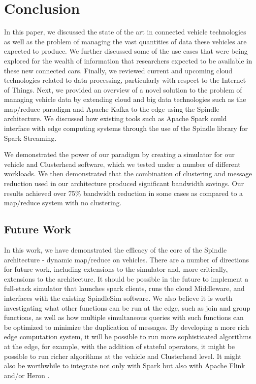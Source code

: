 \documentclass{thesis}
\begin{document}
\chapter{Conclusion}
    In this paper, we discussed the state of the art in connected vehicle technologies as well as the problem
    of managing the vast quantities of data these vehicles are expected to produce. We further discussed
    some of the use cases that were being explored for the wealth of information that researchers expected
    to be available in these new connected cars. Finally, we reviewed current and upcoming cloud technologies
    related to data processing, particularly with respect to the Internet of Things. Next, we provided an
    overview of a novel solution to the problem of managing vehicle data by extending cloud and big data 
    technologies such as the map/reduce paradigm and Apache Kafka to the edge using the Spindle architecture.
    We discussed how existing tools such as Apache Spark could interface with edge computing systems through
    the use of the Spindle library for Spark Streaming.

    We demonstrated the power of our paradigm by creating a simulator for our vehicle and Clusterhead software,
    which we tested under a number of different workloads. We then demonstrated that the combination of clustering
    and message reduction used in our architecture produced significant bandwidth savings. Our results achieved
    over 75\% bandwidth reduction in some cases as compared to a map/reduce system with no clustering.

\section*{Future Work}
    In this work, we have demonstrated the efficacy of the core of the Spindle architecture - dynamic map/reduce
    on vehicles. There are a number of directions for future work, including extensions to the simulator and, 
    more critically, extensions to the architecture.
    It should be possible in the future to implement a full-stack simulator that launches spark clients, runs
    the cloud Middleware, and interfaces with the existing SpindleSim software. We also believe it is worth
    investigating what other functions can be run at the edge, such as join and group functions, as well
    as how multiple simultaneous queries with such functions can be optimized to minimize the duplication
    of messages. By developing a more rich edge computation system, it will be possible to run more sophisticated
    algorithms at the edge, for example, with the addition of stateful operators, it might be possible to run
    richer algorithms at the vehicle and Clusterhead level.
    It might also be worthwhile to integrate not only with Spark but also with Apache Flink \cite{flink}
    and/or Heron \cite{heron}.
\end{document}
